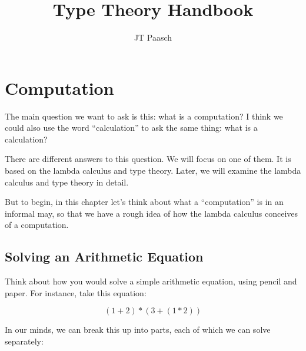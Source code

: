 \documentclass{book}
\numberwithin{equation}{chapter}
\begin{document}
\title{Type Theory Handbook}
\author{JT Paasch}

\frontmatter

\maketitle


\tableofcontents


\mainmatter


\chapter{Computation}

The main question we want to ask is this: what is a computation? I think we could also use the word ``calculation'' to ask the same thing: what is a calculation? 

There are different answers to this question. We will focus on one of them. It is based on the lambda calculus and type theory. Later, we will examine the lambda calculus and type theory in detail.

But to begin, in this chapter let's think about what a ``computation'' is in an informal may, so that we have a rough idea of how the lambda calculus conceives of a computation.


\section{Solving an Arithmetic Equation}

Think about how you would solve a simple arithmetic equation, using pencil and paper. For instance, take this equation:

\begin{equation}
(1 + 2) * (3 + (1 * 2))
\end{equation}

\noindent
In our minds, we can break this up into parts, each of which we can solve separately: 
\end{document}
